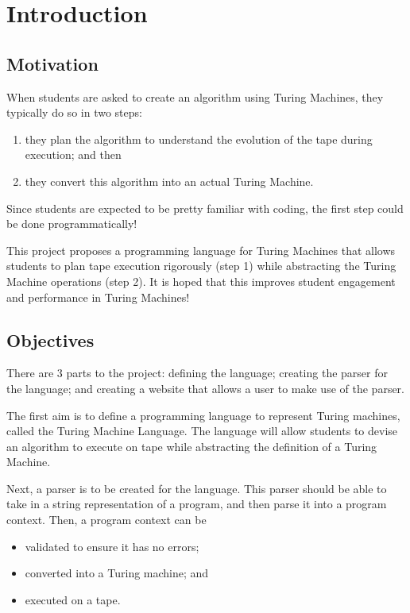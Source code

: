 \chapter{Introduction}


\section{Motivation}
When students are asked to create an algorithm using Turing Machines, they typically do so in two steps:
\begin{enumerate}
    \item they plan the algorithm to understand the evolution of the tape during execution; and then
    \item they convert this algorithm into an actual Turing Machine.
\end{enumerate}
Since students are expected to be pretty familiar with coding, the first step could be done programmatically!

This project proposes a programming language for Turing Machines that allows students to plan tape execution rigorously (step 1) while abstracting the Turing Machine operations (step 2). It is hoped that this improves student engagement and performance in Turing Machines!

\section{Objectives}
There are 3 parts to the project: defining the language; creating the parser for the language; and creating a website that allows a user to make use of the parser.

The first aim is to define a programming language to represent Turing machines, called the Turing Machine Language. The language will allow students to devise an algorithm to execute on tape while abstracting the definition of a Turing Machine.

Next, a parser is to be created for the language. This parser should be able to take in a string representation of a program, and then parse it into a program context. Then, a program context can be 
\begin{itemize}
    \item validated to ensure it has no errors; 
    \item converted into a Turing machine; and
    \item executed on a tape.
\end{itemize}

